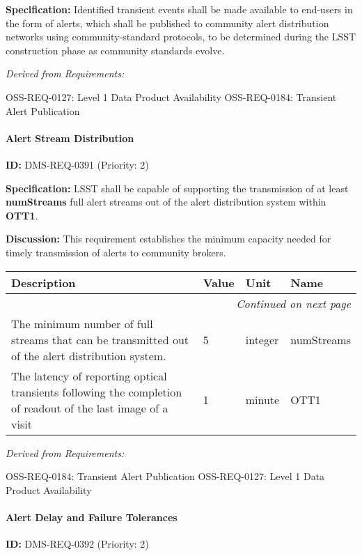 \documentclass[SE,toc,lsstdraft]{lsstdoc}
\makeatletter
\newcommand{\paramname}[1]{\hspace{0pt}#1}
\newcommand{\unitname}[1]{\hspace{0pt}#1}
\newenvironment{parameters}[0]{%
\setlength\LTleft{0pt}
\setlength\LTright{\fill}
\begin{small}
\begin{longtable}[]{|p{0.49\textwidth}|l|p{0.6in}|p{1.70in}@{}|}

\hline \textbf{Description} & \textbf{Value} & \textbf{Unit} & \textbf{Name} \\ \hline
\endhead

\hline \multicolumn{4}{r}{\emph{Continued on next page}} \\
\endfoot

\hline\hline
\endlastfoot
}{%
\hline
\end{longtable}
\end{small}
}
\makeatother
\begin{document}
\textbf{Specification:} Identified transient events shall be made available to end-users in the form of alerts, which shall be published to community alert distribution networks using community-standard protocols, to be determined during the LSST construction phase as community standards evolve.

\emph{Derived from Requirements:}

OSS-REQ-0127:
Level 1 Data Product Availability \newline
OSS-REQ-0184:
Transient Alert Publication \newline

\paragraph{Alert Stream Distribution}\hfill  %

\label{DMS-REQ-0391}
\textbf{ID:} DMS-REQ-0391 (Priority: 2)

\textbf{Specification:}
LSST shall be capable of supporting the transmission of at least \textbf{numStreams} full alert streams out of the alert distribution system within \textbf{OTT1}.

\textbf{Discussion:}
This requirement establishes the minimum capacity needed for timely transmission of alerts to community brokers.

\begin{parameters}
The minimum number of full streams that can be transmitted out of the alert distribution system.
&
5
&
\unitname{%
integer
}
&
\paramname{%
numStreams
} \\\hline
The latency of reporting optical transients following the completion of readout of the last image of a visit
&
1
&
\unitname{%
minute
}
&
\paramname{%
OTT1
} \\\hline
\end{parameters}

\emph{Derived from Requirements:}

OSS-REQ-0184:
Transient Alert Publication \newline
OSS-REQ-0127:
Level 1 Data Product Availability \newline

\paragraph{Alert Delay and Failure Tolerances}\hfill  %

\label{DMS-REQ-0392}
\textbf{ID:} DMS-REQ-0392 (Priority: 2)
\end{document}
